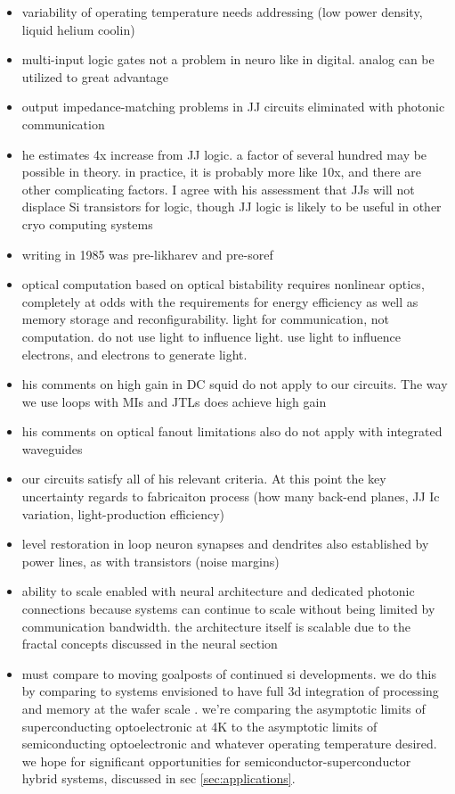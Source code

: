 \begin{itemize}
\item variability of operating temperature needs addressing (low power density, liquid helium coolin)
\item multi-input logic gates not a problem in neuro like in digital. analog can be utilized to great advantage
\item output impedance-matching problems in JJ circuits eliminated with photonic communication
\item he estimates 4x increase from JJ logic. a factor of several hundred may be possible in theory. in practice, it is probably more like 10x, and there are other complicating factors. I agree with his assessment that JJs will not displace Si transistors for logic, though JJ logic is likely to be useful in other cryo computing systems
\item writing in 1985 was pre-likharev and pre-soref
\item optical computation based on optical bistability requires nonlinear optics, completely at odds with the requirements for energy efficiency as well as memory storage and reconfigurability. light for communication, not computation. do not use light to influence light. use light to influence electrons, and electrons to generate light.
\item his comments on high gain in DC squid do not apply to our circuits. The way we use loops with MIs and JTLs does achieve high gain
\item his comments on optical fanout limitations also do not apply with integrated waveguides
\item our circuits satisfy all of his relevant criteria. At this point the key uncertainty regards to fabricaiton process (how many back-end planes, JJ Ic variation, light-production efficiency)
\item level restoration in loop neuron synapses and dendrites also established by power lines, as with transistors (noise margins)
\item ability to scale enabled with neural architecture and dedicated photonic connections because systems can continue to scale without being limited by communication bandwidth. the architecture itself is scalable due to the fractal concepts discussed in the neural section
\item must compare to moving goalposts of continued si developments. we do this by comparing to systems envisioned to have full 3d integration of processing and memory at the wafer scale \cite{kuwa2017}. we're comparing the asymptotic limits of superconducting optoelectronic at 4K to the asymptotic limits of semiconducting optoelectronic and whatever operating temperature desired. we hope for significant opportunities for semiconductor-superconductor hybrid systems, discussed in sec \ref{sec:applications}.

\end{itemize}
